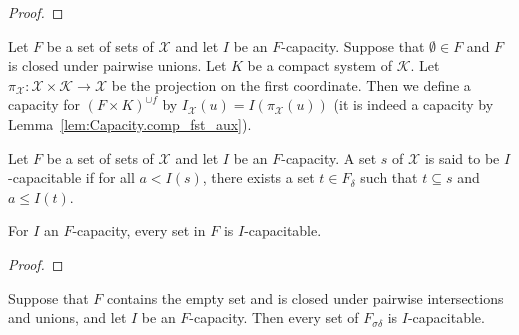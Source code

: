 \begin{proof}\leanok

\end{proof}


\begin{definition}\label{def:Capacity.comp_fst}
  \leanok
Let $F$ be a set of sets of $\mathcal{X}$ and let $I$ be an $F$-capacity.
Suppose that $\emptyset \in F$ and $F$ is closed under pairwise unions.
Let $K$ be a compact system of $\mathcal{K}$.
Let $\pi_{\mathcal{X}} : \mathcal{X} \times \mathcal{K} \to \mathcal{X}$ be the projection on the first coordinate.
Then we define a capacity for $(F \times K)^{\cup f}$ by $I_{\mathcal{X}}(u) = I(\pi_{\mathcal{X}}(u))$ (it is indeed a capacity by Lemma~\ref{lem:Capacity.comp_fst_aux}).
\end{definition}


\begin{definition}\label{def:IsCapacitable}
  \leanok
Let $F$ be a set of sets of $\mathcal{X}$ and let $I$ be an $F$-capacity.
A set $s$ of $\mathcal{X}$ is said to be $I$-capacitable if for all $a < I(s)$, there exists a set $t \in F_\delta$ such that $t \subseteq s$ and $a \le I(t)$.
\end{definition}


\begin{lemma}\label{lem:isCapacitable_of_prop}
  \leanok
For $I$ an $F$-capacity, every set in $F$ is $I$-capacitable.
\end{lemma}

\begin{proof}\leanok

\end{proof}


\begin{lemma}\label{lem:isCapacitable_mem_countableInfClosure_countableSupClosure}
  \leanok
Suppose that $F$ contains the empty set and is closed under pairwise intersections and unions, and let $I$ be an $F$-capacity.
Then every set of $F_{\sigma \delta}$ is $I$-capacitable.
\end{lemma}

